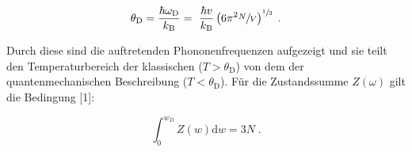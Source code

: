 \begin{equation}
    \label{eqn:Debye}
    \theta_\text{D} = \frac{\hbar\omega_\text{D}}{k_\text{B}} = \
    \frac{\hbar v}{k_\text{B}} \left(6\pi^2\sfrac{N}{V}\right)^{\sfrac{1}{3}} \; .
\end{equation}

Durch diese sind die auftretenden Phononenfrequenzen aufgezeigt und sie teilt den Temperaturbereich der klassischen ($T > \theta_\text{D}$)
von dem der quantenmechanischen Beschreibung ($T < \theta_\text{D}$).
Für die Zustandssumme $Z(\omega)$ gilt die Bedingung [1]:

\begin{equation}
    \label{eqn:Natome}
    \int_0^{w_D} Z\left(w\right)\text{d}w = 3N \; .
\end{equation}
